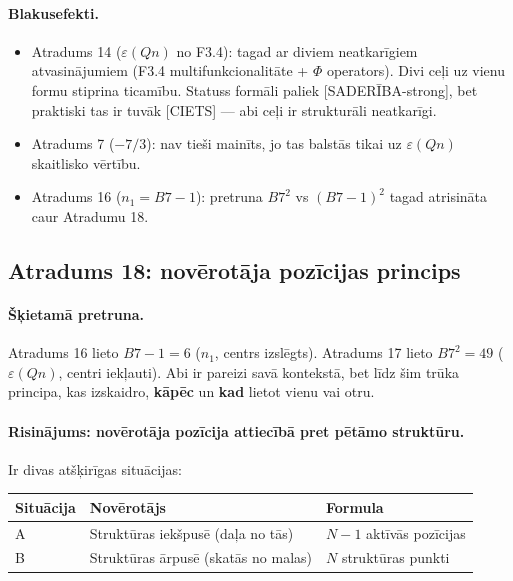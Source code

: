 \documentclass[12pt,a4paper]{article}
\begin{document}
\paragraph{Blakusefekti.}
\begin{itemize}
    \item Atradums 14 ($\varepsilon(Qn)$ no F3.4): tagad ar diviem neatkarīgiem atvasinājumiem (F3.4 multifunkcionalitāte + $\Phi$ operators). Divi ceļi uz vienu formu stiprina ticamību. Statuss formāli paliek [SADERĪBA-strong], bet praktiski tas ir tuvāk [CIETS] — abi ceļi ir strukturāli neatkarīgi.
    \item Atradums 7 ($-7/3$): nav tieši mainīts, jo tas balstās tikai uz $\varepsilon(Qn)$ skaitlisko vērtību.
    \item Atradums 16 ($n_1 = B7-1$): pretruna $B7^2$ vs $(B7-1)^2$ tagad atrisināta caur Atradumu 18.
\end{itemize}

\subsection*{Atradums 18: novērotāja pozīcijas princips}

\paragraph{Šķietamā pretruna.}
Atradums 16 lieto $B7-1 = 6$ ($n_1$, centrs izslēgts). Atradums 17 lieto $B7^2 = 49$ ($\varepsilon(Qn)$, centri iekļauti). Abi ir pareizi savā kontekstā, bet līdz šim trūka principa, kas izskaidro, \textbf{kāpēc} un \textbf{kad} lietot vienu vai otru.

\paragraph{Risinājums: novērotāja pozīcija attiecībā pret pētāmo struktūru.}
Ir divas atšķirīgas situācijas:

\begin{table}[h]
\centering
\begin{tabular}{|l|l|l|}
\hline
\textbf{Situācija} & \textbf{Novērotājs} & \textbf{Formula} \\
\hline
A & Struktūras iekšpusē (daļa no tās) & $N-1$ aktīvās pozīcijas \\
B & Struktūras ārpusē (skatās no malas) & $N$ struktūras punkti \\
\hline
\end{tabular}
\end{table}
\end{document}
